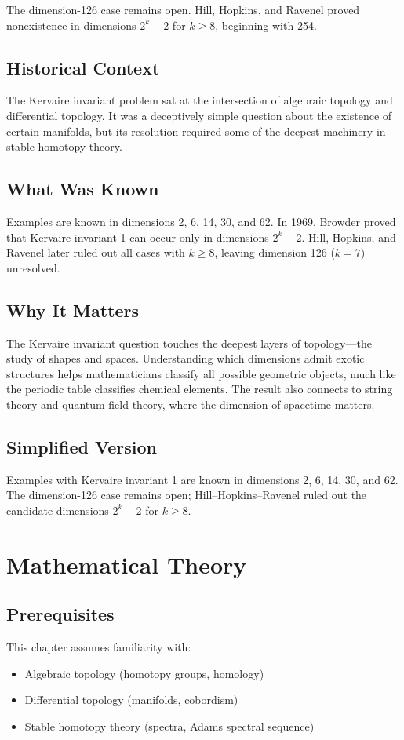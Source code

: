 The dimension-126 case remains open. Hill, Hopkins, and Ravenel proved nonexistence in dimensions $2^k-2$ for $k\geq 8$, beginning with 254.

\subsection{Historical Context}
The Kervaire invariant problem sat at the intersection of algebraic topology and differential topology. It was a deceptively simple question about the existence of certain manifolds, but its resolution required some of the deepest machinery in stable homotopy theory.

\subsection{What Was Known}
Examples are known in dimensions 2, 6, 14, 30, and 62. In 1969, Browder proved that Kervaire invariant 1 can occur only in dimensions $2^k-2$. Hill, Hopkins, and Ravenel later ruled out all cases with $k\geq 8$, leaving dimension 126 ($k=7$) unresolved.

\subsection{Why It Matters}
The Kervaire invariant question touches the deepest layers of topology---the study of shapes and spaces. Understanding which dimensions admit exotic structures helps mathematicians classify all possible geometric objects, much like the periodic table classifies chemical elements. The result also connects to string theory and quantum field theory, where the dimension of spacetime matters.

\subsection{Simplified Version}
Examples with Kervaire invariant 1 are known in dimensions 2, 6, 14, 30, and 62. The dimension-126 case remains open; Hill--Hopkins--Ravenel ruled out the candidate dimensions $2^k-2$ for $k\geq8$.

\section{Mathematical Theory}


\subsection{Prerequisites}
This chapter assumes familiarity with:
\begin{itemize}
\item Algebraic topology (homotopy groups, homology)
\item Differential topology (manifolds, cobordism)
\item Stable homotopy theory (spectra, Adams spectral sequence)
\end{itemize}

